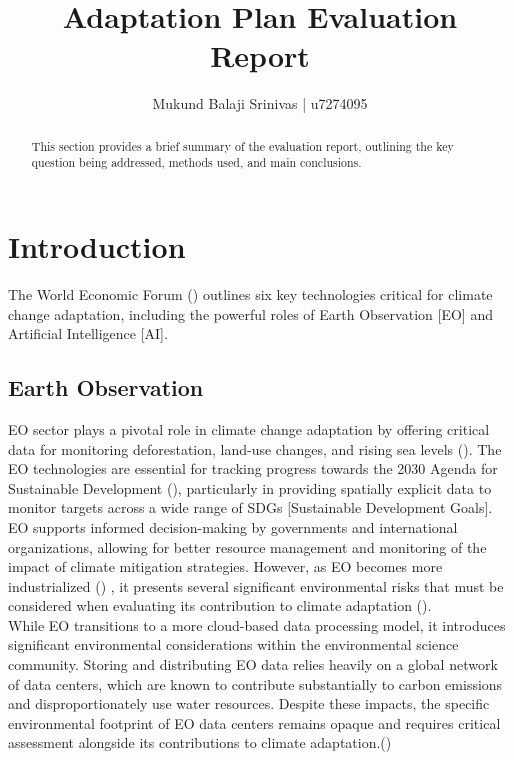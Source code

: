 \documentclass[12pt]{article}
\title{Adaptation Plan Evaluation Report}
\author{Mukund Balaji Srinivas | u7274095}
\date{} %
\begin{document}
\maketitle

\begin{abstract}
This section provides a brief summary of the evaluation report, outlining the key question being addressed, methods used, and main conclusions.
\end{abstract}

\newpage

\section*{Introduction}

The World Economic Forum (\cite{masterson_2024})  outlines six key technologies critical for climate change adaptation, 
including the powerful roles of Earth Observation [EO] and Artificial Intelligence [AI]. 


\subsection*{Earth Observation}
EO sector plays a pivotal role in climate change adaptation by offering critical data for monitoring deforestation, land-use changes, and rising sea levels (\cite{anderson_2017}). 
The EO technologies are essential for tracking progress towards the 2030 Agenda for Sustainable Development (\cite{unitednations_2015}), particularly in providing spatially explicit data to monitor targets across 
a wide range of SDGs [Sustainable Development Goals]. EO supports informed decision-making by governments and international 
organizations, allowing for better resource management and monitoring of the impact of climate mitigation strategies.
However, as EO becomes more industrialized (\cite{venkatesan_2020}) , it presents several significant environmental risks  
that must be considered when evaluating its contribution to climate adaptation (\cite{crisp_2020}). \\
While EO transitions to a more cloud-based data processing model, it introduces significant environmental 
considerations within the environmental science community. Storing and distributing EO data relies heavily on a global network of data centers, 
which are known to contribute substantially to carbon emissions and disproportionately use water resources. Despite these impacts, the specific 
environmental footprint of EO data centers remains opaque and requires critical assessment alongside its contributions to climate adaptation.(\cite{wilkinson_2024})
\end{document}
